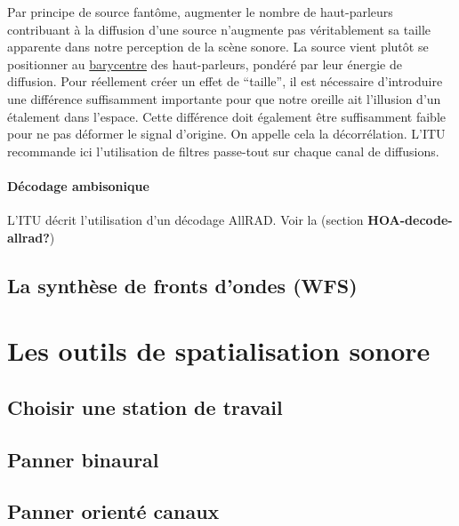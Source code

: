 \documentclass[
  letterpaper,
  DIV=11,
  numbers=noendperiod]{scrreprt}
\begin{document}
Par principe de source fantôme, augmenter le nombre de haut-parleurs
contribuant à la diffusion d'une source n'augmente pas véritablement sa
taille apparente dans notre perception de la scène sonore. La source
vient plutôt se positionner au
\href{https://fr.wikipedia.org/wiki/Barycentre}{barycentre} des
haut-parleurs, pondéré par leur énergie de diffusion. Pour réellement
créer un effet de ``taille'', il est nécessaire d'introduire une
différence suffisamment importante pour que notre oreille ait l'illusion
d'un étalement dans l'espace. Cette différence doit également être
suffisamment faible pour ne pas déformer le signal d'origine. On appelle
cela la décorrélation. L'ITU recommande ici l'utilisation de filtres
passe-tout sur chaque canal de diffusions.

\hypertarget{duxe9codage-ambisonique}{%
\subsection{Décodage ambisonique}\label{duxe9codage-ambisonique}}

L'ITU décrit l'utilisation d'un décodage AllRAD. Voir la (section
\textbf{HOA-decode-allrad?})

\hypertarget{sec-wfs}{%
\chapter{La synthèse de fronts d'ondes (WFS)}\label{sec-wfs}}

\part{Les outils de spatialisation sonore}

\hypertarget{choisir-une-station-de-travail}{%
\chapter{Choisir une station de
travail}\label{choisir-une-station-de-travail}}

\hypertarget{panner-binaural}{%
\chapter{Panner binaural}\label{panner-binaural}}

\hypertarget{panner-orientuxe9-canaux}{%
\chapter{Panner orienté canaux}\label{panner-orientuxe9-canaux}}
\end{document}

